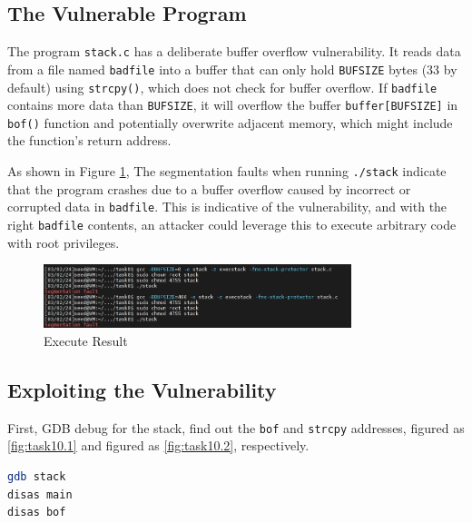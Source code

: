 \documentclass[a4paper,11pt]{article}
\begin{document}
\subsection{The Vulnerable Program}
The program \verb|stack.c| has a deliberate buffer overflow vulnerability. It reads data from a file named \verb|badfile| into a buffer that can only hold \verb|BUFSIZE| bytes (33 by default) using \verb|strcpy()|, which does not check for buffer overflow. If \verb|badfile| contains more data than \verb|BUFSIZE|, it will overflow the buffer \verb|buffer[BUFSIZE]| in \verb|bof()| function and potentially overwrite adjacent memory, which might include the function's return address.

As shown in Figure \ref{fig:task9}, The segmentation faults when running \verb|./stack| indicate that the program crashes due to a buffer overflow caused by incorrect or corrupted data in \verb|badfile|. This is indicative of the vulnerability, and with the right \verb|badfile| contents, an attacker could leverage this to execute arbitrary code with root privileges.
\begin{figure}[h]
    \centering
       \includegraphics[width=0.8\textwidth]{figures/task9/task9.png}
    \caption{Execute Result}\label{fig:task9}
\end{figure}

\subsection{Exploiting the Vulnerability}
First, GDB debug for the stack, find out the \verb|bof| and \verb|strcpy| addresses, figured as \ref{fig:task10.1} and figured as \ref{fig:task10.2}, respectively.
\begin{lstlisting}[caption={GDB debug for the stack},label={lst:task3.10-1},language=BASH,breaklines=true]
gdb stack
disas main
disas bof
\end{lstlisting} 
\end{document}
